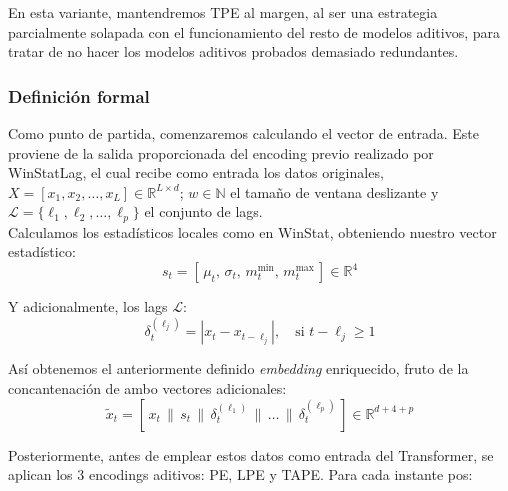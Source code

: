 En esta variante, mantendremos TPE al margen, al ser una estrategia parcialmente solapada con el funcionamiento del resto de modelos aditivos, para tratar de no hacer los modelos aditivos probados demasiado redundantes.

\subsubsection{Definición formal}

Como punto de partida, comenzaremos calculando el vector de entrada. Este proviene de la salida proporcionada del encoding previo realizado por WinStatLag, el cual recibe como entrada los datos originales, $X = [x_1, x_2, \dots, x_L] \in \mathbb{R}^{L \times d}$; $w \in \mathbb{N}$ el tamaño de ventana deslizante y $\mathcal{L} = \{\ell_1, \ell_2, \dots, \ell_p\}$ el conjunto de lags.\\


Calculamos los estadísticos locales como en WinStat, obteniendo nuestro vector estadístico:
\[
s_t = [\,\mu_t,\, \sigma_t,\, m^{\min}_t,\, m^{\max}_t\,] \in \mathbb{R}^4
\]

Y adicionalmente, los lags $\mathcal{L}$:
\[
\delta_t^{(\ell_j)} = | x_t - x_{t - \ell_j}|, \quad \text{si } t - \ell_j \geq 1
\]

Así obtenemos el anteriormente definido \textit{embedding} enriquecido, fruto de la concantenación de ambo vectores adicionales:
\[
\tilde{x}_t = [\,x_t \,\|\, s_t \,\|\, \delta_t^{(\ell_1)} \,\|\, \dots \,\|\, \delta_t^{(\ell_p)}\,] \in \mathbb{R}^{d + 4 + p}
\]

Posteriormente, antes de emplear estos datos como entrada del Transformer, se aplican los 3 encodings aditivos: PE, LPE y TAPE. Para cada instante pos:

